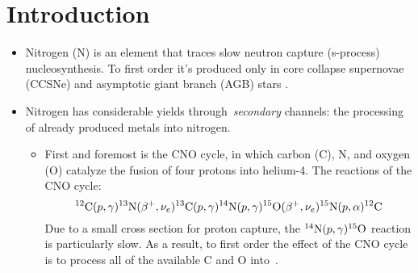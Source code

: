 \documentclass[ms.tex]{subfiles}
\begin{document}
 

\section{Introduction} 
\begin{itemize} 
	\item Nitrogen (N) is an element that traces slow neutron capture 
	(s-process) nucleosynthesis. To first order it's produced only in core 
	collapse supernovae (CCSNe) and asymptotic giant branch (AGB) stars 
	\citep{Johnson2019}. 

	\item Nitrogen has considerable yields through~\textit{secondary} channels: 
	the processing of already produced metals into nitrogen. 
	\begin{itemize} 
		\item First and foremost is the CNO cycle, in which carbon (C), N, and 
		oxygen (O) catalyze the fusion of four protons into helium-4. The 
		reactions of the CNO cycle: 
		\begin{equation} 
		^{12}\text{C}(p,\gamma)^{13}\text{N}(\beta^+,\nu_e)^{13}\text{C} 
		(p,\gamma)^{14}\text{N}(p,\gamma)^{15}\text{O}(\beta^+,\nu_e)
		^{15}\text{N}(p,\alpha)^{12}\text{C} 
		\end{equation} 
		Due to a small cross section for proton capture, the 
		$^{14}\text{N}(p,\gamma)^{15}\text{O}$ reaction is particularly slow. 
		As a result, to first order the effect of the CNO cycle is to process 
		all of the available C and O into~\Nfourteen. 
	\end{itemize} 
\end{itemize} 
\end{document}
